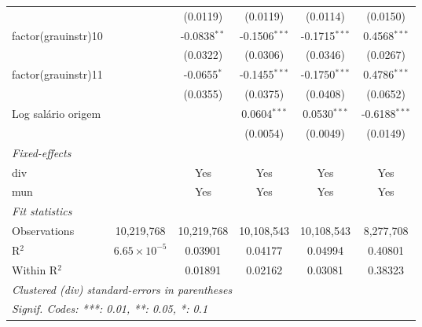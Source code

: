 \begin{tabular}{lccccc}
                            &                       & (0.0119)                & (0.0119)                & (0.0114)                & (0.0150)\\   
   factor(grauinstr)10      &                       & -0.0838$^{**}$          & -0.1506$^{***}$         & -0.1715$^{***}$         & 0.4568$^{***}$\\   
                            &                       & (0.0322)                & (0.0306)                & (0.0346)                & (0.0267)\\   
   factor(grauinstr)11      &                       & -0.0655$^{*}$           & -0.1455$^{***}$         & -0.1750$^{***}$         & 0.4786$^{***}$\\   
                            &                       & (0.0355)                & (0.0375)                & (0.0408)                & (0.0652)\\   
   Log salário origem       &                       &                         & 0.0604$^{***}$          & 0.0530$^{***}$          & -0.6188$^{***}$\\   
                            &                       &                         & (0.0054)                & (0.0049)                & (0.0149)\\   
   \midrule
   \emph{Fixed-effects}\\
   div                      &                       & Yes                     & Yes                     & Yes                     & Yes\\  
   mun                      &                       & Yes                     & Yes                     & Yes                     & Yes\\  
   \midrule
   \emph{Fit statistics}\\
   Observations             & 10,219,768            & 10,219,768              & 10,108,543              & 10,108,543              & 8,277,708\\  
   R$^2$                    & $6.65\times 10^{-5}$  & 0.03901                 & 0.04177                 & 0.04994                 & 0.40801\\  
   Within R$^2$             &                       & 0.01891                 & 0.02162                 & 0.03081                 & 0.38323\\  
   \midrule \midrule
   \multicolumn{6}{l}{\emph{Clustered (div) standard-errors in parentheses}}\\
   \multicolumn{6}{l}{\emph{Signif. Codes: ***: 0.01, **: 0.05, *: 0.1}}\\
\end{tabular}
\par\endgroup



